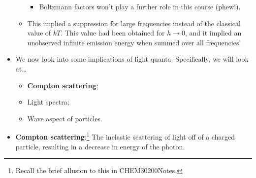 \documentclass[../notes.tex]{subfiles}
\begin{document}
\begin{itemize}
\begin{itemize}
\begin{itemize}
            \item Boltzmann factors won't play a further role in this course (phew!).
        \end{itemize}
        \item This implied a suppression for large frequencies instead of the classical value of $kT$. This value had been obtained for $h\to 0$, and it implied an unobserved infinite emission energy when summed over all frequencies!
    \end{itemize}
    \item We now look into some implications of light quanta. Specifically, we will look at\dots
    \begin{itemize}
        \item \textbf{Compton scattering};
        \item Light spectra;
        \item Wave aspect of particles.
    \end{itemize}
    \item \textbf{Compton scattering}:\footnote{Recall the brief allusion to this in CHEM30200Notes.} The inelastic scattering of light off of a charged particle, resulting in a decrease in energy of the photon.
    \begin{figure}[H]
        \centering
\end{figure}
\end{itemize}
\end{document}
